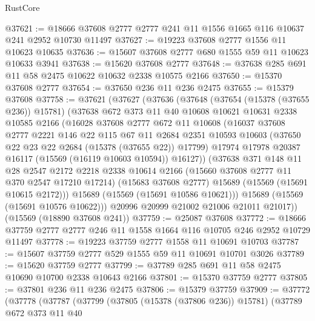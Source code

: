 \begin{lexlean}{RustCore}
\begin{coremodule}
@37621 := @18666 @37608 @2777 @2777 @241 @11 @1556 @1665 @116 @10637 @241 @2952 @10730 @11497
@37627 := @19223 @37608 @2777 @1556 @11 @10623 @10635
@37636 := @15607 @37608 @2777 @680 @1555 @59 @11 @10623 @10633 @3941
@37638 := @15620 @37608 @2777
@37648 := @37638 @285 @691 @11 @58 @2475 @10622 @10632 @2338 @10575 @2166
@37650 := @15370 @37608 @2777
@37654 := @37650 @236 @11 @236 @2475
@37655 := @15379 @37608
@37758 := @37621
    (@37627
      (@37636
        (@37648
          (@37654 (@15378 (@37655 @236)) @15781)
          (@37638
            @672
            @373
            @11
            @40
            @10608
            @10621
            @10631
            @2338
            @10585
            @2166
            (@16028
              @37608
              @2777
              @672
              @11
              @10608
              (@16037
                @37608
                @2777
                @2221
                @146
                @22
                @115
                @67
                @11
                @2684
                @2351
                @10593
                @10603
                (@37650 @22 @23 @22 @2684 (@15378 (@37655 @22)) @17799)
                @17974
                @17978
                @20387
                @16117
                (@15569 (@16119 @10603 @10594))
                @16127))
            (@37638
              @371
              @148
              @11
              @28
              @2547
              @2172
              @2218
              @2338
              @10614
              @2166
              (@15660 @37608 @2777 @11 @370 @2547 @17210 @17214)
              (@15683 @37608 @2777)
              @15689
              (@15569 (@15691 @10615 @2172)))
            @15689
            (@15569 (@15691 @10586 @10621)))
          @15689
          (@15569 (@15691 @10576 @10622)))
        @20996
        @20999
        @21002
        @21006
        @21011
        @21017))
    (@15569 (@18890 @37608 @241))
@37759 := @25087 @37608
@37772 := @18666 @37759 @2777 @2777 @246 @11 @1558 @1664 @116 @10705 @246 @2952 @10729 @11497
@37778 := @19223 @37759 @2777 @1558 @11 @10691 @10703
@37787 := @15607 @37759 @2777 @529 @1555 @59 @11 @10691 @10701 @3026
@37789 := @15620 @37759 @2777
@37799 := @37789 @285 @691 @11 @58 @2475 @10690 @10700 @2338 @10643 @2166
@37801 := @15370 @37759 @2777
@37805 := @37801 @236 @11 @236 @2475
@37806 := @15379 @37759
@37909 := @37772
    (@37778
      (@37787
        (@37799
          (@37805 (@15378 (@37806 @236)) @15781)
          (@37789
            @672
            @373
            @11
            @40

\end{coremodule}
\end{lexlean}
